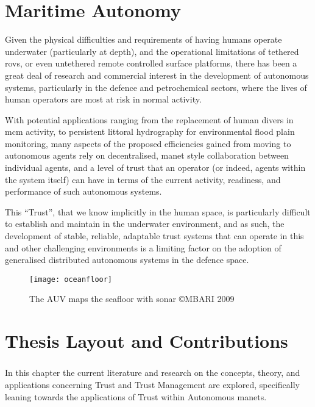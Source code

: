 \section{Maritime Autonomy}

Given the physical difficulties and requirements of having humans operate underwater (particularly at depth), and the operational limitations of tethered \glspl{rov}, or even untethered remote controlled surface platforms, there has been a great deal of research and commercial interest in the development of autonomous systems, particularly in the defence and petrochemical sectors, where the lives of human operators are most at risk in normal activity\cite{Pechoucek:2008:DIA:1355335}.

With potential applications ranging from the replacement of human divers in \gls{mcm} activity, to persistent littoral hydrography for environmental flood plain monitoring, many aspects of the proposed efficiencies gained from moving to autonomous agents rely on decentralised, \gls{manet} style collaboration between individual agents, and a level of trust that an operator (or indeed, agents within the system itself) can have in terms of the current activity, readiness, and performance of such autonomous systems\cite{Wynn2014}.

This ``Trust'', that we know implicitly in the human space, is particularly difficult to establish and maintain in the underwater environment, and as such, the development of stable, reliable, adaptable trust systems that can operate in this and other challenging environments is a limiting factor on the adoption of generalised distributed autonomous systems in the defence space\cite{Caseley2009}.

\begin{figure}[h]
	\centering
	\texttt{[image: oceanfloor]}
	\caption{The AUV maps the seafloor with sonar \copyright MBARI 2009}
\end{figure}


\section{Thesis Layout and Contributions}

\subsubsection{}
In this chapter the current literature and research on the concepts, theory, and applications concerning Trust and Trust Management are explored, specifically leaning towards the applications of Trust within Autonomous \glspl{manet}.

